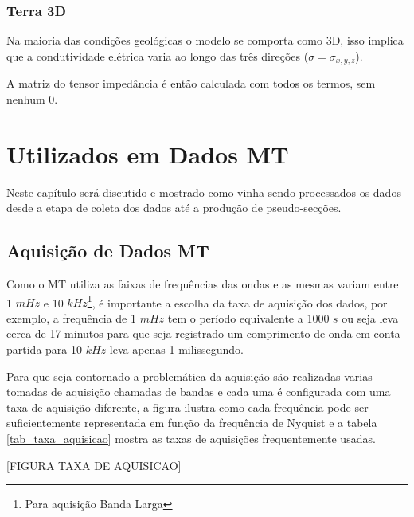         
        \subsection{Terra 3D}
        Na maioria das condições geológicas o modelo se comporta como 3D, isso implica que a 
	    condutividade elétrica varia ao longo das três direções ($\sigma = \sigma_{x,y,z}$).
	    
	    A matriz do tensor impedância é então calculada com todos os termos, sem nenhum 0.    

    \chapter{ Utilizados em Dados MT}
        \label{cap-proc_mt}
            
        Neste capítulo será discutido e mostrado como vinha sendo processados os dados \MT desde a etapa de coleta dos dados até a produção de pseudo-secções.  
        
    \section{Aquisição de Dados MT}
    
        Como o MT utiliza as faixas de frequências das ondas e as mesmas variam entre 1 $mHz$ e 10 $kHz$\footnote{Para aquisição Banda Larga}, é importante a escolha da taxa de aquisição dos dados, por exemplo, a frequência de 1 $mHz$ tem o período equivalente a 1000 $s$ ou seja leva cerca de 17 minutos para que seja registrado um comprimento de onda em conta partida para 10 $kHz$ leva apenas 1 milissegundo.
        
        Para que seja contornado a problemática da aquisição são realizadas varias tomadas de aquisição chamadas de bandas e cada uma é configurada com uma taxa de aquisição diferente, a figura \citar{\ref{fig_taxa_aquisicao}} ilustra como cada frequência pode ser suficientemente representada em função da frequência de Nyquist \cite{nyquist28} e a tabela \ref{tab_taxa_aquisicao} mostra as taxas de aquisições frequentemente usadas. 
        
        \begin{center} [FIGURA TAXA DE AQUISICAO]\end{center}
                                                  
